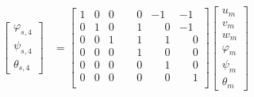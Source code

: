\documentclass[10pt,b5paper,titlepage]{book}
\newenvironment{eqarray}
{
    \begin{eqnarray}
        \begin{aligned}
}
{
        \end{aligned}
    \end{eqnarray}
}
\begin{document}
\begin{eqarray}
\begin{bmatrix}
        \varphi_{s,4} \\
        \psi_{s,4} \\
        \theta_{s,4}
    \end{bmatrix}
    &= \begin{bmatrix}
        1 & 0 & 0 & \phantom{-}0 & -1 & -1 \\
        0 & 1 & 0 & \phantom{-}1 & \phantom{-}0 & -1 \\
        0 & 0 & 1 & \phantom{-}1 & \phantom{-}1 & \phantom{-}0 \\
        0 & 0 & 0 & \phantom{-}1 & \phantom{-}0 & \phantom{-}0 \\
        0 & 0 & 0 & \phantom{-}0 & \phantom{-}1 & \phantom{-}0 \\
        0 & 0 & 0 & \phantom{-}0 & \phantom{-}0 & \phantom{-}1 \\
    \end{bmatrix}
    \begin{bmatrix}
        u_m \\
        v_m \\
        w_m \\
        \varphi_m \\
        \psi_m \\
        \theta_m
    \end{bmatrix}
\end{eqarray}
\renewcommand\arraystretch{1}
\end{document}
